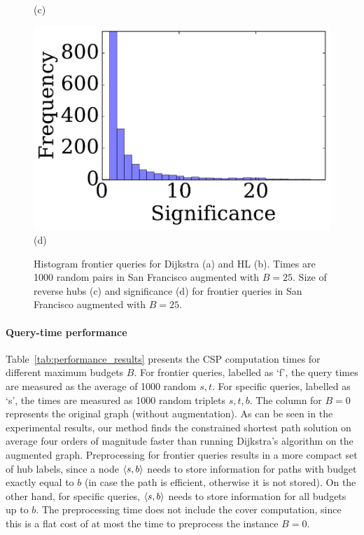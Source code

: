 \begin{figure}
{\begin{minipage}[t]{.25\textwidth}
(c)
\end{minipage}
\begin{minipage}[t]{.25\textwidth}
\centering
\includegraphics[clip, trim = 1.3cm 0.3cm 0cm 0cm,scale=0.3]{TexImg/significance.pdf}
(d)
\end{minipage}
}
\caption{ Histogram frontier queries for Dijkstra (a) and HL (b). Times are 1000 random pairs in San Francisco augmented with $B=25$.
Size of reverse hubs (c) and significance (d) for frontier queries in San Francisco augmented with $B=25$.
}
\label{fig:SF_query}
\label{fig:SF_bwd_size}
\end{figure}

\paragraph{Query-time performance}
Table~\ref{tab:performance_results} presents the CSP computation times for different maximum budgets $B$. 
For frontier queries, labelled as `f', the query times are measured as the average of 1000 random $s,t$.
For specific queries, labelled as `s', the times are measured as 1000 random triplets $s,t,b$.
The column for $B=0$ represents the original graph (without augmentation). 
As can be seen in the experimental results, our method finds the constrained shortest path solution on average four orders of magnitude faster than running Dijkstra's algorithm on the augmented graph. 
Preprocessing for frontier queries results in a more compact set of hub labels, since a node $\langle s,b\rangle$ needs to store information for paths with budget exactly equal to $b$ (in case the path is efficient, otherwise it is not stored).
On the other hand, for specific queries, $\langle s,b\rangle$ needs to store information for all budgets up to $b$.
The preprocessing time does not include the cover computation, since this is a flat cost of at most the time to preprocess the instance $B=0$.

